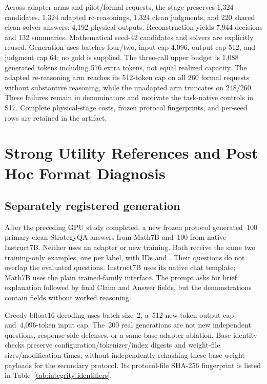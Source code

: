 \documentclass[journal,onecolumn]{IEEEtran}
\begin{document}
Across adapter arms and pilot/formal requests, the stage preserves 1,324 candidates, 1,324 adapted re-reasonings, 1,324 clean judgments, and 220 shared clean-solver answers: 4,192 physical outputs. Reconstruction yields 7,944 decisions and 132 summaries. Mathematical seed-42 candidates and solvers are explicitly reused. Generation uses batches four/two, input cap 4,096, output cap 512, and judgment cap 64; no gold is supplied. The three-call upper budget is 1,088 generated tokens including 576 extra tokens, not equal realized capacity. The adapted re-reasoning arm reaches its 512-token cap on all 260 formal requests without substantive reasoning, while the unadapted arm truncates on 248/260. These failures remain in denominators and motivate the task-native controls in S17. Complete physical-stage costs, frozen protocol fingerprints, and per-seed rows are retained in the artifact.

\section{Strong Utility References and Post Hoc Format Diagnosis}
\label{sec:s16}
\label{sec:strong-references}
\subsection{Separately registered generation}
After the preceding GPU study completed, a new frozen protocol generated~100 primary-clean StrategyQA answers from Math7B and~100 from native Instruct7B. Neither uses an adapter or new training. Both receive the same two training-only examples, one per label, with IDs  and . Their questions do not overlap the evaluated questions. Instruct7B uses its native chat template; Math7B uses the plain trained-family interface. The prompt asks for brief explanation followed by final Claim and Answer fields, but the demonstrations contain fields without worked reasoning.

Greedy bfloat16 decoding uses batch size~2, a~512-new-token output cap and~4,096-token input cap. The~200 real generations are not new independent questions, response-side defenses, or a same-base adapter ablation. Base identity checks preserve configuration/tokenizer/index digests and weight-file sizes/modification times, without independently rehashing these base-weight payloads for the secondary protocol. Its protocol-file SHA-256 fingerprint is listed in Table~\ref{tab:integrity-identifiers}.
\end{document}
